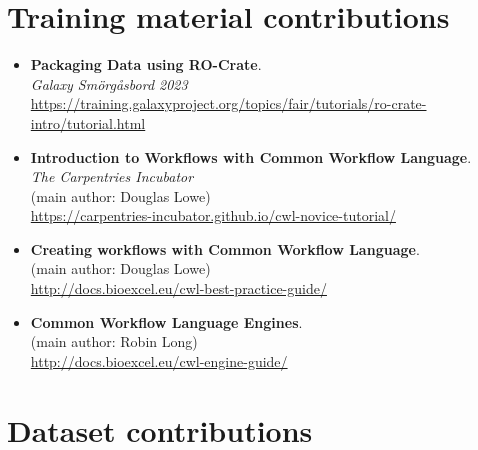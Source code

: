 \section{Training material contributions}

\begin{itemize}
  \item
    \textbf{Packaging Data using RO-Crate}.\\
    \emph{Galaxy Smörgåsbord 2023}\\
    \url{https://training.galaxyproject.org/topics/fair/tutorials/ro-crate-intro/tutorial.html}
  \item
    \textbf{Introduction to Workflows with Common Workflow Language}.\\
    \emph{The Carpentries Incubator}\\
    (main author: Douglas Lowe)\\
    \url{https://carpentries-incubator.github.io/cwl-novice-tutorial/}
  \item
    \textbf{Creating workflows with Common Workflow Language}.\\
    (main author: Douglas Lowe)\\
    \url{http://docs.bioexcel.eu/cwl-best-practice-guide/}
  \item
    \textbf{Common Workflow Language Engines}.\\
    (main author: Robin Long)\\
    \url{http://docs.bioexcel.eu/cwl-engine-guide/}
  \end{itemize}


\section{Dataset contributions}

